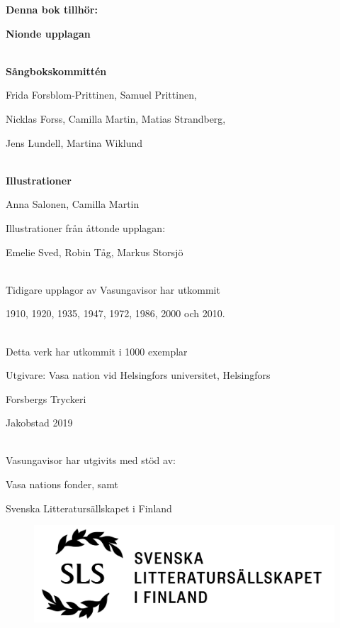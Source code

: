 
\begin{small}
\begin{center}
	\textbf{Denna bok tillhör:}
\end{center}
\end{small}
\vspace{0.5cm}
\hrulefill
\newpage
\begin{scriptsize}
\begin{center}
\textbf{Nionde upplagan}
~\\
~\\
{
\textbf{Sångbokskommittén}

Frida Forsblom-Prittinen, Samuel Prittinen, 

Nicklas Forss, Camilla Martin, Matias Strandberg,

Jens Lundell, Martina Wiklund

~\\

\textbf{Illustrationer}


Anna Salonen, Camilla Martin

Illustrationer från åttonde upplagan:

Emelie Sved, Robin Tåg, Markus Storsjö

~\\

Tidigare upplagor av Vasungavisor har utkommit

1910, 1920, 1935, 1947, 1972, 1986, 2000 och 2010.

~\\

Detta verk har utkommit i 1000 exemplar

Utgivare: Vasa nation vid Helsingfors universitet, Helsingfors

Forsbergs Tryckeri

Jakobstad 2019

~\\

Vasungavisor har utgivits med stöd av:

Vasa nations fonder, samt

Svenska Litteratursällskapet i Finland

\begin{figure}[h!]
	\includegraphics[width=\linewidth]{SLS_logo.png}
\end{figure}

}
\end{center}
\end{scriptsize}
